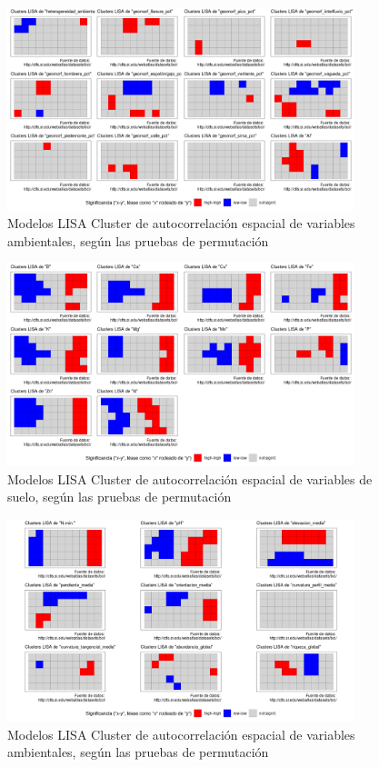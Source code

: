 \documentclass[11pt,]{article}
\begin{document}
\begin{figure}
\centering
\includegraphics[width=0.90000\textwidth]{LISA_amb.png}
\caption{Modelos LISA Cluster de autocorrelación espacial de variables
ambientales, según las pruebas de permutación\label{fig:amb_perm}}
\end{figure}

\begin{figure}
\centering
\includegraphics[width=0.90000\textwidth]{LISA_suelo.png}
\caption{Modelos LISA Cluster de autocorrelación espacial de variables
de suelo, según las pruebas de permutación\label{fig:perm_suelo}}
\end{figure}

\begin{figure}
\centering
\includegraphics[width=0.90000\textwidth]{LISA_suelo2.png}
\caption{Modelos LISA Cluster de autocorrelación espacial de variables
ambientales, según las pruebas de permutación\label{fig:suelo2}}
\end{figure}
\end{document}
